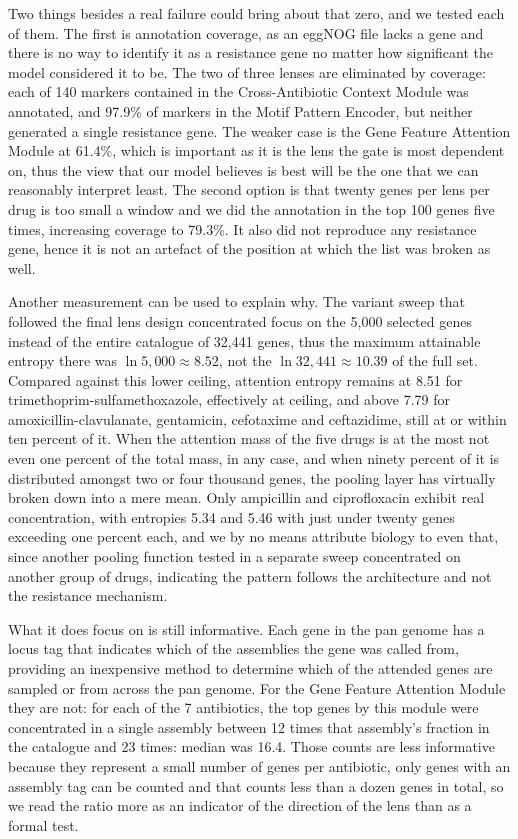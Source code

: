 \vspace{1em}

Two things besides a real failure could bring about that zero, and we tested each of them. The first is annotation coverage, as an eggNOG file lacks a gene and there is no
way to identify it as a resistance gene no matter how significant the model considered it to be.
The two of three lenses are eliminated by coverage: each of 140 markers contained in the
Cross-Antibiotic Context Module was annotated, and 97.9\% of markers in the Motif Pattern Encoder,
but neither generated a single resistance gene. The weaker case is the Gene Feature Attention
Module at 61.4\%, which is important as it is the lens the gate is most dependent on, thus the
view that our model believes is best will be the one that we can reasonably interpret least. The
second option is that twenty genes per lens per drug is too small a window and we did the
annotation in the top 100 genes five times, increasing coverage to 79.3\%. It also did not
reproduce any resistance gene, hence it is not an artefact of the position at which the list was
broken as well.

Another measurement can be used to explain why. The variant sweep that followed the final lens
design concentrated focus on the 5{,}000 selected genes instead of the entire catalogue of
32{,}441 genes, thus the maximum attainable entropy there was $\ln 5{,}000 \approx 8.52$, not the
$\ln 32{,}441 \approx 10.39$ of the full set. Compared against this lower ceiling, attention
entropy remains at 8.51 for trimethoprim-sulfamethoxazole, effectively at ceiling, and above 7.79
for amoxicillin-clavulanate, gentamicin, cefotaxime and ceftazidime, still at or within ten percent
of it. When the attention mass of the five drugs is at the most not even one percent of the total
mass, in any case, and when ninety percent of it is distributed amongst two or four thousand
genes, the pooling layer has virtually broken down into a mere mean. Only ampicillin and
ciprofloxacin exhibit real concentration, with entropies 5.34 and 5.46 with just under twenty
genes exceeding one percent each, and we by no means attribute biology to even that, since another
pooling function tested in a separate sweep concentrated on another group of drugs, indicating the
pattern follows the architecture and not the resistance mechanism.

\vspace{1em}

What it does focus on is still informative. Each gene in the pan genome has a locus
tag that indicates which of the assemblies the gene was called from, providing an inexpensive
method to determine which of the attended genes are sampled or from across the pan genome. For the
Gene Feature Attention Module they are not: for each of the 7 antibiotics, the top genes by this
module were concentrated in a single assembly between 12 times that assembly's fraction in the
catalogue and 23 times: median was 16.4. Those counts are less informative because they represent a
small number of genes per antibiotic, only genes with an assembly tag can be counted and that
counts less than a dozen genes in total, so we read the ratio more as an indicator of the direction
of the lens than as a formal test.

